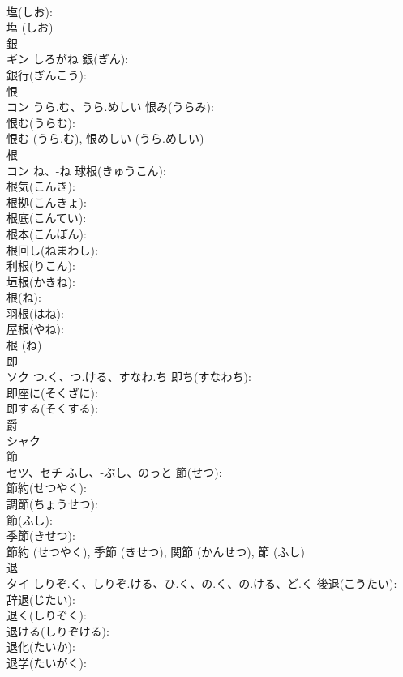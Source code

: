 \documentclass[8pt]{extreport}
\begin{document}
\begin{CJK}{UTF8}{min}
\\	塩(しお): 
\\	塩 (しお)
\\	銀			
\\	ギン	しろがね	銀(ぎん): 
\\	銀行(ぎんこう): 
\\	恨			
\\	コン	うら.む、うら.めしい	恨み(うらみ): 
\\	恨む(うらむ): 
\\	恨む (うら.む), 恨めしい (うら.めしい)
\\	根			
\\	コン	ね、-ね	球根(きゅうこん): 
\\	根気(こんき): 
\\	根拠(こんきょ): 
\\	根底(こんてい): 
\\	根本(こんぽん): 
\\	根回し(ねまわし): 
\\	利根(りこん): 
\\	垣根(かきね): 
\\	根(ね): 
\\	羽根(はね): 
\\	屋根(やね): 
\\	根 (ね)
\\	即			
\\	ソク	つ.く、つ.ける、すなわ.ち	即ち(すなわち): 
\\	即座に(そくざに): 
\\	即する(そくする): 
\\	爵			
\\	シャク			
\\	節			
\\	セツ、セチ	ふし、-ぶし、のっと	節(せつ): 
\\	節約(せつやく): 
\\	調節(ちょうせつ): 
\\	節(ふし): 
\\	季節(きせつ): 
\\	節約 (せつやく), 季節 (きせつ), 関節 (かんせつ), 節 (ふし)
\\	退			
\\	タイ	しりぞ.く、しりぞ.ける、ひ.く、の.く、の.ける、ど.く	後退(こうたい): 
\\	辞退(じたい): 
\\	退く(しりぞく): 
\\	退ける(しりぞける): 
\\	退化(たいか): 
\\	退学(たいがく): 

\end{CJK}
\end{document}
